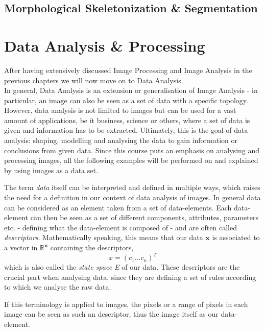 \subsection{Morphological Skeletonization \& Segmentation}


\section{Data Analysis \& Processing}
After having extensively discussed Image Processing and Image Analysis in the previous chapters we will now move on to Data Analysis. \\In general, Data Analysis is an extension or generalisation of Image Analysis - in particular, an image can also be seen as a set of data with a specific topology. However, data analysis is not limited to images but can be used for a vast amount of applications, be it business, science or others, where a set of data is given and information has to be extracted. Ultimately, this is the goal of data analysis: shaping, modelling and analysing the data to gain information or conclusions from given data.
Since this course puts an emphasis on analysing and processing images, all the following examples will be performed on and explained by using images as a data set.

The term \textit{data} itself can be interpreted and defined in multiple ways, which raises the need for a definition in our context of data analysis of images.
In general data can be considered as an element taken from a set of data-elements. Each data-element can then be seen as a set of different components, attributes, parameters etc. - defining what the data-element is composed of - and are often called \textit{descriptors}. Mathematically speaking, this means that our data $\boldsymbol{x}$ is associated to a vector in $\boldsymbol{\mathbb{R}^n}$ containing the descriptors,
\begin{equation*}
	x = (c_1 ... c_n)^T
\end{equation*}
which is also called the \textit{state space E} of our data.
These descriptors are the crucial part when analysing data, since they are defining a set of rules according to which we analyse the raw data.

If this terminology is applied to images, the pixels or a range of pixels in each image can be seen as such an descriptor, thus the image itself as our data-element.

